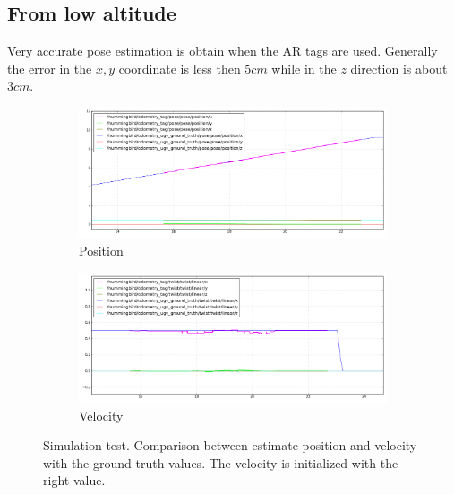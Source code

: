 \subsection{From low altitude}
Very accurate pose estimation is obtain when the AR tags are used. Generally the error in the $x,y$ coordinate is less then $5cm$ while in the $z$ direction is about $3cm$.
\begin{figure}[!htbp]
  \centering
   \begin{subfigure}[b]{0.45\textwidth}
        \includegraphics[width=\textwidth]{img/position_simulation_hot_init.png}
        \caption{Position }
        \label{fig:one}
   \end{subfigure}\hfill
   \begin{subfigure}[b]{0.45\textwidth}
        \includegraphics[width=\textwidth]{img/velocity_simulation_hot_init.png}
        \caption{Velocity}
        \label{fig:two}
   \end{subfigure}
  \caption{Simulation test. Comparison between estimate position and velocity with the ground truth values. The velocity is initialized with the right value.}
  \label{fig:ekf_simulation_hot_init}
\end{figure} 

